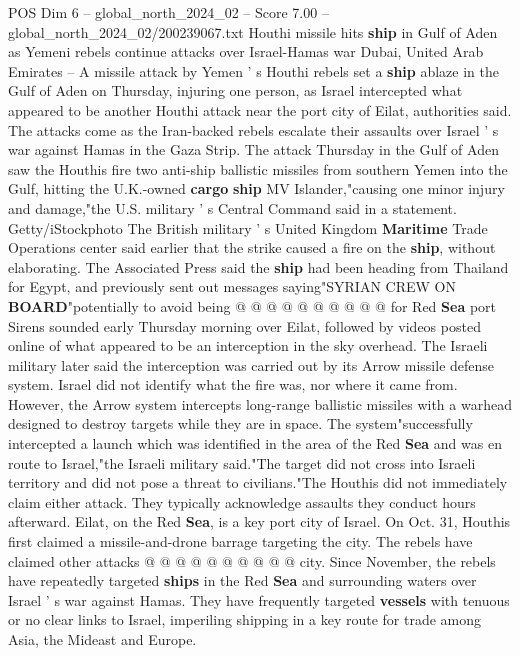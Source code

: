 \begin{textsample}{POS Dim 6 – global\_north\_2024\_02 – Score 7.00 – global\_north\_2024\_02/200239067.txt}  \label{ex:f6_pos_194}
Houthi missile hits \textbf{ship} in Gulf of Aden as Yemeni rebels continue attacks over Israel-Hamas war Dubai, United Arab Emirates -- A missile attack by Yemen ' s Houthi rebels set a \textbf{ship} ablaze in the Gulf of Aden on Thursday, injuring one person, as Israel intercepted what appeared to be another Houthi attack near the port city of Eilat, authorities said.
The attacks come as the Iran-backed rebels escalate their assaults over Israel ' s war against Hamas in the Gaza Strip.
The attack Thursday in the Gulf of Aden saw the Houthis fire two anti-ship ballistic missiles from southern Yemen into the Gulf, hitting the U.K.-owned \textbf{cargo} \textbf{ship} MV Islander,"causing one minor injury and damage,"the U.S. military ' s Central Command said in a statement.
Getty/iStockphoto The British military ' s United Kingdom \textbf{Maritime} Trade Operations center said earlier that the strike caused a fire on the \textbf{ship}, without elaborating.
The Associated Press said the \textbf{ship} had been heading from Thailand for Egypt, and previously sent out messages saying"SYRIAN CREW ON \textbf{BOARD}"potentially to avoid being @ @ @ @ @ @ @ @ @ @ for Red \textbf{Sea} port Sirens sounded early Thursday morning over Eilat, followed by videos posted online of what appeared to be an interception in the sky overhead.
The Israeli military later said the interception was carried out by its Arrow missile defense system.
Israel did not identify what the fire was, nor where it came from.
However, the Arrow system intercepts long-range ballistic missiles with a warhead designed to destroy targets while they are in space.
The system"successfully intercepted a launch which was identified in the area of the Red \textbf{Sea} and was en route to Israel,"the Israeli military said."The target did not cross into Israeli territory and did not pose a threat to civilians."The Houthis did not immediately claim either attack.
They typically acknowledge assaults they conduct hours afterward.
Eilat, on the Red \textbf{Sea}, is a key port city of Israel.
On Oct. 31, Houthis first claimed a missile-and-drone barrage targeting the city.
The rebels have claimed other attacks @ @ @ @ @ @ @ @ @ @ city.
Since November, the rebels have repeatedly targeted \textbf{ships} in the Red \textbf{Sea} and surrounding waters over Israel ' s war against Hamas.
They have frequently targeted \textbf{vessels} with tenuous or no clear links to Israel, imperiling shipping in a key route for trade among Asia, the Mideast and Europe.

\end{textsample}
